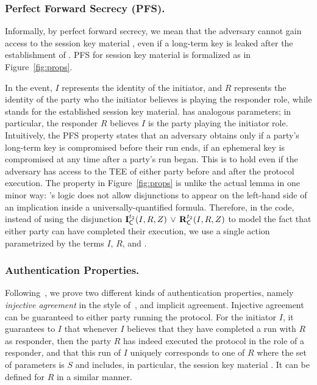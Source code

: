 \subsubsection{Perfect Forward Secrecy (PFS).}
\label{sec:secrecy}
Informally, by perfect forward secrecy, we mean that the adversary cannot
gain access to the session key material \mSessKey{}, even if a long-term key is
leaked after the establishment of \mSessKey{}.
%
PFS for session key material \mSessKey{} is formalized as \mPredPfs{}
in Figure~\ref{fig:props}.
%

In the \mIComplete{} event, $I$ represents the identity of the initiator,
and $R$ represents the identity of the party who the initiator believes is
playing the responder role, while \mSessKey{} stands for the established
session key material.
%
\mRComplete{} has analogous parameters; in particular, the responder $R$
believes $I$ is the party playing the initiator role.
%
Intuitively, the PFS property states that an adversary obtains \mSessKey{}
only if a party's long-term key is compromised before their run ends, if an
ephemeral key is compromised at any time after a party's run began.
%
This is to hold even if the adversary has access to the TEE of either party
before and after the protocol execution.
%
The property in Figure~\ref{fig:props} is unlike the actual \mTamarin{} lemma
in one minor way: \mTamarin's logic does not allow disjunctions to appear on
the left-hand side of an implication inside a universally-quantified formula.
%
Therefore, in the \mTamarin{} code, instead of using the disjunction
$\mathbf{I}_{\textsf{C}}^{t_2}(I, R, Z)\, \lor\,  \mathbf{R}_{\textsf{C}}^{t_2}(I, R, 
Z)$
to model the fact that either party can have completed their execution, we use
a single action parametrized by the terms $I$, $R$, and \mSessKey.

\subsubsection{Authentication Properties.}
\label{sec:authenticationDef}
Following~\cite{Norr21}, we prove two different kinds of authentication
properties, namely \emph{injective agreement} in the style
of~\cite{DBLP:conf/csfw/Lowe97a}, and implicit agreement.
%
Injective agreement can be guaranteed to either party running the protocol.
%
For the initiator $I$, it guarantees to $I$ that whenever $I$ believes that
they have completed a run with $R$ as responder, then the party $R$ has 
indeed
executed the protocol in the role of a responder, and that this run of $I$
uniquely corresponds to one of $R$ where the set of parameters is $S$ and
includes, in particular, the session key material \mSessKey{}.
%
It can be defined for $R$ in a similar manner.


